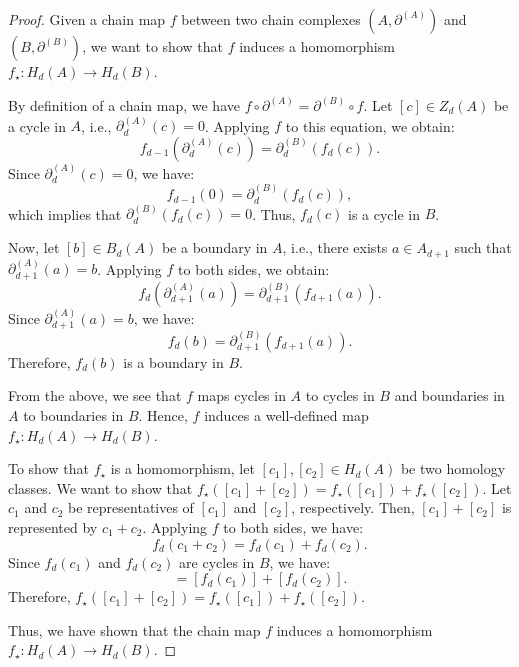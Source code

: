\begin{proof}
	Given a chain map $f$ between two chain complexes $(A, \partial^{(A)})$ and $(B
	, \partial^{(B)})$, we want to show that $f$ induces a homomorphism
	$f_{\star}: H_{d}(A) \rightarrow H_{d}(B)$.

	By definition of a chain map, we have $f \circ \partial^{(A)}= \partial^{(B)}\circ
	f$. Let $[c] \in Z_{d}(A)$ be a cycle in $A$, i.e., $\partial^{(A)}_{d}(c) = 0$.
	Applying $f$ to this equation, we obtain:
	\begin{equation}
		f_{d-1}(\partial^{(A)}_{d}(c)) = \partial^{(B)}_{d}(f_{d}(c)).
	\end{equation}
	Since $\partial^{(A)}_{d}(c) = 0$, we have:
	\begin{equation}
		f_{d-1}(0) = \partial^{(B)}_{d}(f_{d}(c)),
	\end{equation}
	which implies that $\partial^{(B)}_{d}(f_{d}(c)) = 0$. Thus, $f_{d}(c)$ is a
	cycle in $B$.

	Now, let $[b] \in B_{d}(A)$ be a boundary in $A$, i.e., there exists
	$a \in A_{d+1}$ such that $\partial^{(A)}_{d+1}(a) = b$. Applying $f$ to both sides,
	we obtain:
	\begin{equation}
		f_{d}(\partial^{(A)}_{d+1}(a)) = \partial^{(B)}_{d+1}(f_{d+1}(a)).
	\end{equation}
	Since $\partial^{(A)}_{d+1}(a) = b$, we have:
	\begin{equation}
		f_{d}(b) = \partial^{(B)}_{d+1}(f_{d+1}(a)).
	\end{equation}
	Therefore, $f_{d}(b)$ is a boundary in $B$.

	From the above, we see that $f$ maps cycles in $A$ to cycles in $B$ and boundaries
	in $A$ to boundaries in $B$. Hence, $f$ induces a well-defined map $f_{\star}:
	H_{d}(A) \rightarrow H_{d}(B)$.

	To show that $f_{\star}$ is a homomorphism, let
	$[c_{1}], [c_{2}] \in H_{d}(A)$ be two homology classes. We want to show that $f
	_{\star}([c_{1}] + [c_{2}]) = f_{\star}([c_{1}]) + f_{\star}([c_{2}])$. Let
	$c_{1}$ and $c_{2}$ be representatives of $[c_{1}]$ and $[c_{2}]$, respectively.
	Then, $[c_{1}] + [c_{2}]$ is represented by $c_{1} + c_{2}$. Applying $f$ to
	both sides, we have:
	\begin{equation}
		f_{d}(c_{1} + c_{2}) = f_{d}(c_{1}) + f_{d}(c_{2}).
	\end{equation}
	Since $f_{d}(c_{1})$ and $f_{d}(c_{2})$ are cycles in $B$, we have:
	\begin{equation}
		[f_{d}(c_{1} + c_{2})] = [f_{d}(c_{1})] + [f_{d}(c_{2})].
	\end{equation}
	Therefore, $f_{\star}([c_{1}] + [c_{2}]) = f_{\star}([c_{1}]) + f_{\star}([c_{2}
	])$.

	Thus, we have shown that the chain map $f$ induces a homomorphism
	$f_{\star}: H_{d}(A) \rightarrow H_{d}(B)$.
\end{proof}

